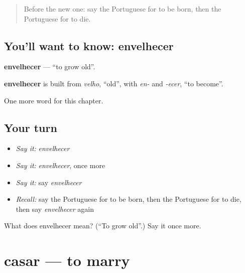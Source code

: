 \label{lesson:PT-C173-envelhecer}



\begin{quote}
Before the new one: say the Portuguese for to be born, then the Portuguese for to die.
\end{quote}

\subsection*{You'll want to know: envelhecer}
\textbf{envelhecer} — \textquotedblleft{}to grow old\textquotedblright{}.

\begin{cousinweb}
\textbf{envelhecer} is built from \emph{velho}, \textquotedblleft{}old\textquotedblright{}, with \emph{en-} and \emph{-ecer}, \textquotedblleft{}to become\textquotedblright{}.
\end{cousinweb}

\begin{grammarlens}[title={What you've built}]
One more word for this chapter.
\end{grammarlens}

\subsection*{Your turn}
\begin{itemize}
\raggedright
  \item \emph{Say it:} \emph{envelhecer}
  \item \emph{Say it:} \emph{envelhecer}, once more
  \item \emph{Say it:} say \emph{envelhecer}
  \item \emph{Recall:} say the Portuguese for to be born, then the Portuguese for to die, then say \emph{envelhecer} again
\end{itemize}

\begin{tcolorbox}[breakable,colback=teal!4,colframe=teal!35!black,title={Before you move on}]
What does envelhecer mean? (\textquotedblleft{}To grow old\textquotedblright{}.) Say it once more.
\end{tcolorbox}
\section[casar]{casar — to marry}

\label{lesson:PT-C173-casar}



